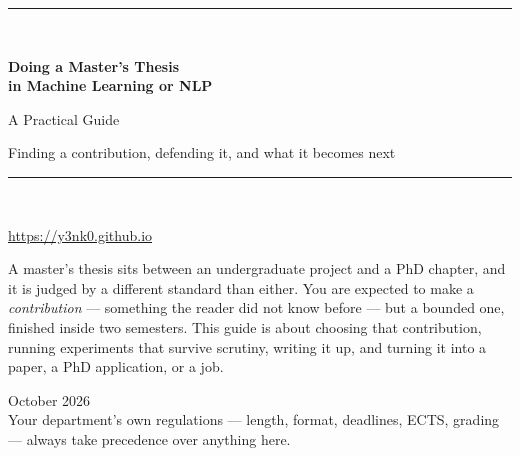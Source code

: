 \documentclass[11pt,a4paper]{article}
\begin{document}
\begin{titlepage}
\centering
\vspace*{2.0cm}
{\color{brandlight}\rule{\textwidth}{2pt}}\\[0.8cm]
{\Huge\bfseries\color{brand} Doing a Master's Thesis\\[0.25cm] in Machine Learning or NLP\par}
\vspace{0.7cm}
{\LARGE\color{ink} A Practical Guide\par}
\vspace{0.5cm}
{\large\color{mutegray} Finding a contribution, defending it, and what it becomes next\par}
\vspace{0.6cm}
{\color{brandlight}\rule{\textwidth}{2pt}}\\[1.1cm]

{\large\bfseries\color{ink} \guideauthor\par}
\vspace{0.18cm}
{\normalsize\color{mutegray} \guideaffiliation\par}
\vspace{0.25cm}
{\footnotesize\color{brandlight}\url{https://y3nk0.github.io}\par}
\vspace{1.1cm}

\begin{minipage}{0.85\textwidth}
\small\color{ink}
A master's thesis sits between an undergraduate project and a PhD chapter, and
it is judged by a different standard than either. You are expected to make a
\emph{contribution} --- something the reader did not know before --- but a
bounded one, finished inside two semesters. This guide is about choosing that
contribution, running experiments that survive scrutiny, writing it up, and
turning it into a paper, a PhD application, or a job.
\end{minipage}

\vfill
{\color{mutegray} October 2026}\\[0.3cm]
{\footnotesize\color{mutegray} Your department's own regulations --- length,
format, deadlines, ECTS, grading --- always take precedence over anything here.}
\end{titlepage}

\tableofcontents
\thispagestyle{fancy}
\clearpage
\end{document}
